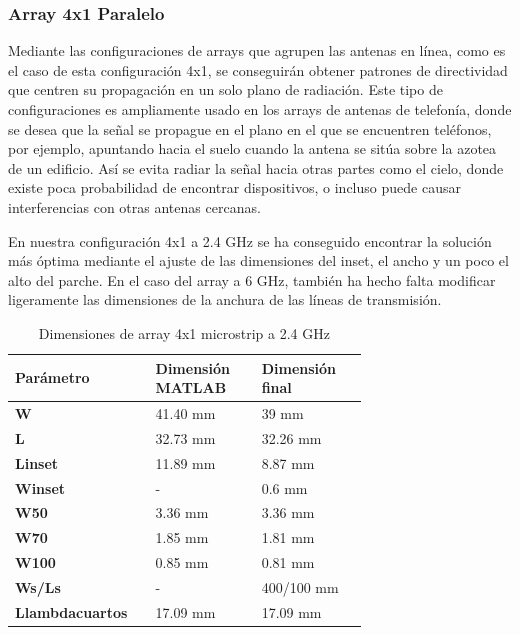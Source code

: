 \subsubsection{Array 4x1 Paralelo} 
\par Mediante las configuraciones de arrays que agrupen las antenas en línea, como es el caso de esta configuración 4x1, se conseguirán obtener patrones de directividad que centren su propagación en un solo plano de radiación. Este tipo de configuraciones es ampliamente usado en los arrays de antenas de telefonía, donde se desea que la señal se propague en el plano en el que se encuentren teléfonos, por ejemplo, apuntando hacia el suelo cuando la antena se sitúa sobre la azotea de un edificio. Así se evita radiar la señal hacia otras partes como el cielo, donde existe poca probabilidad de encontrar dispositivos, o incluso puede causar interferencias con otras antenas cercanas.
\\
\par En nuestra configuración 4x1 a 2.4 GHz se ha conseguido encontrar la solución más óptima mediante el ajuste de las dimensiones del inset, el ancho y un poco el alto del parche. En el caso del array a 6 GHz, también ha hecho falta modificar ligeramente las dimensiones de la anchura de las líneas de transmisión.
\\
\begin{table}[H]
  
   \label{tab:array4x11}
   \small %
   \centering %
   \begin{tabular}{m{0.2\linewidth}m{0.25\linewidth}m{0.25\linewidth}} %
   \toprule[\heavyrulewidth]\toprule[\heavyrulewidth]
   \textbf{Parámetro} & \textbf{Dimensión MATLAB} & \textbf{Dimensión final} \\ 
   \midrule
   \textbf{W} & 41.40 mm & 39 mm \\
   \textbf{L} & 32.73 mm & 32.26 mm\\
   \textbf{Linset} & 11.89 mm & 8.87 mm\\
   \textbf{Winset} & - & 0.6 mm\\
   \textbf{W50} & 3.36 mm & 3.36 mm\\
   \textbf{W70} & 1.85 mm & 1.81 mm\\
   \textbf{W100} & 0.85 mm & 0.81 mm\\
   \textbf{Ws/Ls} & - & 400/100 mm\\
   \textbf{Llambdacuartos} & 17.09 mm & 17.09 mm\\
   \bottomrule[\heavyrulewidth] 
   \end{tabular}
   \caption{Dimensiones de array 4x1 microstrip a 2.4 GHz} 
\end{table}

